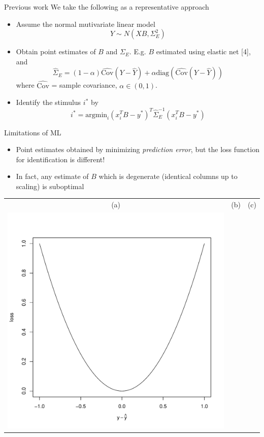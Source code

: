 \documentclass[final]{beamer}
\newlength{\onecolwid}
\begin{document}
\begin{frame}[t]
\begin{columns}[t]
\begin{column}{\onecolwid}
\begin{block}{Previous work}
We take the following as a representative approach
\begin{itemize}
\item Assume the normal mutivariate linear model
\[
Y \sim N(XB, \Sigma_E^2)
\]
\item Obtain point estimates of $B$ and $\Sigma_E$. E.g. $B$ estimated using elastic net [4], and
\[
\hat{\Sigma}_E = (1-\alpha) \hat{\text{Cov}}(Y - \hat{Y}) + \alpha\text{diag}(\hat{\text{Cov}}(Y - \hat{Y}))
\]
where $\hat{\text{Cov}}$ = sample covariance, $\alpha \in (0, 1)$.
\item Identify the stimulus $i^*$ by
\[
i^* = \text{argmin}_{i} (x_i^T B - y^*)^T \hat{\Sigma}_E^{-1} (x_i^T B - y^*)
\]
\end{itemize}
\end{block}

\begin{block}{Limitations of ML}
\begin{itemize}
\item Point estimates obtained by minimizing \emph{prediction error}, but the loss function for identification is different!
\item In fact, any estimate of $B$ which is degenerate (identical columns up to scaling) is suboptimal
\end{itemize}
\begin{center}
\begin{tabular}{ccc}
(a) & (b) & (c)\\
\includegraphics[scale = 0.5, trim = 1in 1in 0.5in 1in, clip]{loss_se.pdf} & 

\end{tabular}
\end{center}
\end{block}
\end{column}
\end{columns}
\end{frame}
\end{document}
